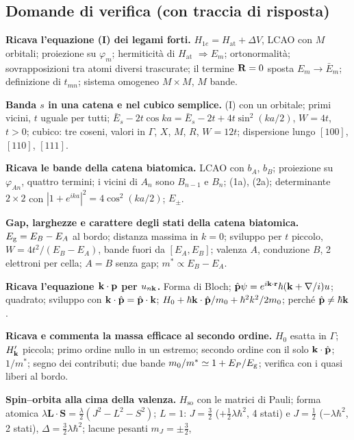 \documentclass[11pt,a4paper]{article}
\begin{document}
\subsection*{Domande di verifica (con traccia di risposta)}
\begin{domande}
\item \textbf{Ricava l'equazione (I) dei legami forti.} $H_{1e}=H_{\mathrm{at}}+\Delta V$, LCAO con $M$ orbitali; proiezione su $\varphi_m$; hermiticità di
$H_{\mathrm{at}}$ $\Rightarrow E_m$; ortonormalità; sovrapposizioni tra atomi diversi trascurate; il termine $\mathbf R=0$ sposta $E_m\to\bar E_m$; definizione di
$t_{mn}$; sistema omogeneo $M\times M$, $M$ bande.
\item \textbf{Banda $s$ in una catena e nel cubico semplice.} (I) con un orbitale; primi vicini, $t$ uguale per tutti; $\bar E_s-2t\cos ka=\bar E_s-2t
+4t\sin^2(ka/2)$, $W=4t$, $t>0$; cubico: tre coseni, valori in $\Gamma$, $X$, $M$, $R$, $W=12t$; dispersione lungo $[100]$, $[110]$, $[111]$.
\item \textbf{Ricava le bande della catena biatomica.} LCAO con $b_A$, $b_B$; proiezione su $\varphi_{An}$, quattro termini; i vicini di $A_n$
sono $B_{n-1}$ e $B_n$; (1a), (2a); determinante $2\times2$ con $|1+e^{ika}|^2=4\cos^2(ka/2)$; $E_\pm$.
\item \textbf{Gap, larghezze e carattere degli stati della catena biatomica.} $E_{\mathrm g}=E_B-E_A$ al bordo; distanza massima in $k=0$; sviluppo per $t$
piccolo, $W=4t^2/(E_B-E_A)$, bande fuori da $[E_A,E_B]$; valenza $A$, conduzione $B$, 2 elettroni per cella; $A=B$ senza gap; $m^*\propto E_B-E_A$.
\item \textbf{Ricava l'equazione $\mathbf k\cdot\mathbf p$ per $u_{n\mathbf k}$.} Forma di Bloch; $\hat{\mathbf p}\psi=e^{i\mathbf k\cdot\mathbf r}\hbar(\mathbf k+\nabla/i)u$; quadrato; sviluppo con
$\mathbf k\cdot\hat{\mathbf p}=\hat{\mathbf p}\cdot\mathbf k$; $H_0+\hbar\mathbf k\cdot\hat{\mathbf p}/m_0+\hbar^2k^2/2m_0$; perché $\hat{\mathbf p}\ne\hbar\mathbf k$.
\item \textbf{Ricava e commenta la massa efficace al secondo ordine.} $H_0$ esatta in $\Gamma$; $H'_{\mathbf k}$ piccola; primo ordine nullo in un estremo;
secondo ordine con il solo $\mathbf k\cdot\hat{\mathbf p}$; $1/m^*$; segno dei contributi; due bande $m_0/m^*\simeq1+E_P/E_{\mathrm g}$; verifica con i quasi liberi al bordo.
\item \textbf{Spin--orbita alla cima della valenza.} $H_{\mathrm{so}}$ con le matrici di Pauli; forma atomica $\lambda\mathbf L\cdot\mathbf S=\frac\lambda2(J^2-L^2-S^2)$;
$L=1$: $J=\frac32$ ($+\frac12\lambda\hbar^2$, 4 stati) e $J=\frac12$ ($-\lambda\hbar^2$, 2 stati), $\Delta=\frac32\lambda\hbar^2$; lacune pesanti $m_J=\pm\frac32$,

\end{domande}
\end{document}
